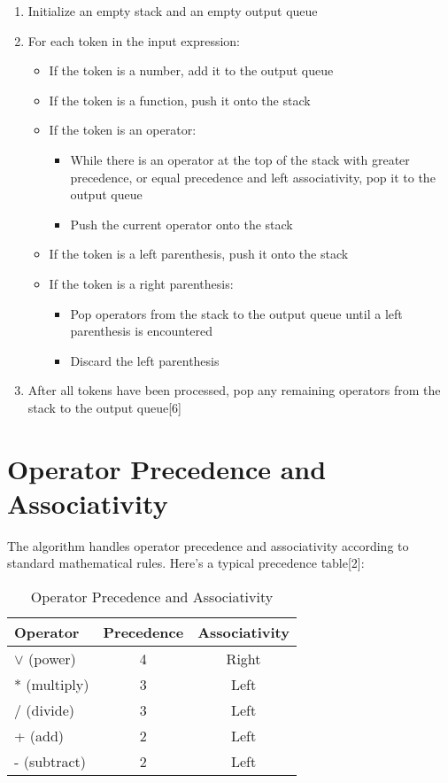 \documentclass[a4paper,12pt]{article}
\begin{document}
\begin{enumerate}
    \item Initialize an empty stack and an empty output queue
    \item For each token in the input expression:
    \begin{itemize}
        \item If the token is a number, add it to the output queue
        \item If the token is a function, push it onto the stack
        \item If the token is an operator:
        \begin{itemize}
            \item While there is an operator at the top of the stack with greater precedence, or equal precedence and left associativity, pop it to the output queue
            \item Push the current operator onto the stack
        \end{itemize}
        \item If the token is a left parenthesis, push it onto the stack
        \item If the token is a right parenthesis:
        \begin{itemize}
            \item Pop operators from the stack to the output queue until a left parenthesis is encountered
            \item Discard the left parenthesis
        \end{itemize}
    \end{itemize}
    \item After all tokens have been processed, pop any remaining operators from the stack to the output queue[6]
\end{enumerate}

\section{Operator Precedence and Associativity}

The algorithm handles operator precedence and associativity according to standard mathematical rules. Here's a typical precedence table[2]:

\begin{table}[h]
    \centering
    \begin{tabular}{lcc}
        \toprule
        \textbf{Operator} & \textbf{Precedence} & \textbf{Associativity} \\
        \midrule
        $\vee$ (power) & 4 & Right \\
        * (multiply) & 3 & Left \\
        / (divide) & 3 & Left \\
        + (add) & 2 & Left \\
        - (subtract) & 2 & Left \\
        \bottomrule
    \end{tabular}
    \caption{Operator Precedence and Associativity}
    \label{tab:precedence}
\end{table}
\end{document}
